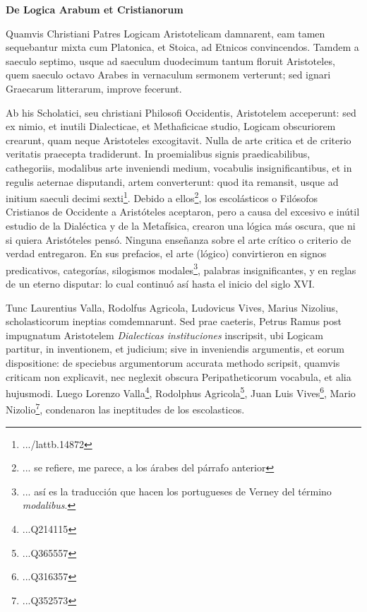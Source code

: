 \documentclass{article}
\begin{document}
\begin{paracol}{2}
  \textbf{De Logica Arabum et Cristianorum}
  \switchcolumn
  
\end{paracol}
\vspace{0.5cm}
\begin{paracol}{2}
  Quamvis Christiani Patres Logicam Aristotelicam damnarent, eam tamen sequebantur mixta cum Platonica, et Stoica, ad Etnicos convincendos. Tamdem a saeculo septimo, usque ad saeculum duodecimum tantum floruit Aristoteles, quem saeculo octavo Arabes in vernaculum sermonem verterunt; sed ignari Graecarum litterarum, improve fecerunt.
  \switchcolumn
  
\end{paracol}
\vspace{0.5cm}
\begin{paracol}{2}
  Ab his Scholatici, seu christiani Philosofi Occidentis, Aristotelem acceperunt: sed ex nimio, et inutili Dialecticae, et Methaficicae studio, Logicam obscuriorem crearunt, quam neque Aristoteles excogitavit. Nulla de arte critica et de criterio veritatis praecepta tradiderunt. In proemialibus signis praedicabilibus, cathegoriis, modalibus arte inveniendi medium, vocabulis insignificantibus, et in regulis aeternae disputandi, artem converterunt: quod ita remansit, usque ad initium saeculi decimi sexti\footnote{.../lattb.14872}.
  \switchcolumn
  Debido a ellos\footnote{... se refiere, me parece, a los árabes del párrafo anterior}, los escolásticos o Filósofos Cristianos de Occidente a Aristóteles aceptaron, pero a causa del excesivo e inútil estudio de la Dialéctica y de la Metafísica, crearon una lógica más oscura, que ni si quiera Aristóteles pensó. Ninguna enseñanza sobre el arte crítico o criterio de verdad entregaron. En sus prefacios, el arte (lógico) convirtieron en signos predicativos, categorías, silogismos modales\footnote{... así es la traducción que hacen los portugueses de Verney del término \emph{modalibus}.}, palabras insignificantes, y en reglas de un eterno disputar: lo cual continuó así hasta el inicio del siglo XVI.
\end{paracol}
\vspace{0.5cm}
\begin{paracol}{2}
  Tunc Laurentius Valla, Rodolfus Agricola, Ludovicus Vives, Marius Nizolius, scholasticorum ineptias comdemnarunt. Sed prae caeteris, Petrus Ramus post impugnatum Aristotelem \emph{Dialecticas instituciones} inscripsit, ubi Logicam partitur, in inventionem, et judicium; sive in inveniendis argumentis, et eorum dispositione: de speciebus argumentorum accurata methodo scripsit, quamvis criticam non explicavit, nec neglexit obscura Peripatheticorum vocabula, et alia hujusmodi.
  \switchcolumn
  Luego Lorenzo Valla\footnote{...Q214115}, Rodolphus Agricola\footnote{...Q365557}, Juan Luis Vives\footnote{...Q316357}, Mario Nizolio\footnote{...Q352573}, condenaron las ineptitudes de los escolasticos. 
  
\end{paracol}
\vspace{0.5cm}
\begin{paracol}{2}

  \switchcolumn
  
\end{paracol}
\end{document}
